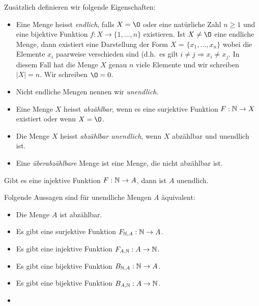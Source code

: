 \begin{definition}{}
    Zusätzlich definieren wir folgende Eigenschaften:
    \begin{itemize}
        \item Eine Menge heisst \emph{endlich}, falls $X = \O$ oder eine natürliche Zahl $n \geq 1$ und eine bijektive Funktion $f : X \rightarrow \{1,\dots,n\}$ existieren.
        Ist $X \neq \O$ eine endliche Menge, dann existiert eine Darstellung der Form $X$ = $\{x_1,\dots,x_n\}$ wobei die Elemente $x_i$ paarweise verschieden sind (d.h.\ es gilt $i \neq j \Rightarrow x_i \neq x_j$.
        In diesem Fall hat die Menge $X$ genau $n$ viele Elemente und wir schreiben $|X| = n$.
        Wir schreiben $\O = 0$.
        \item Nicht endliche Mengen nennen wir \emph{unendlich}.
        \item Eine Menge $X$ heisst \emph{abzählbar}, wenn es eine surjektive Funktion $F: \mathbb{N} \rightarrow X$ existiert oder wenn $X = \O$.
        \item Die Menge $X$ heisst \emph{abzählbar unendlich}, wenn $X$ abzählbar und unendlich ist.
        \item Eine \emph{überabzählbare} Menge ist eine Menge, die nicht abzählbar ist.
    \end{itemize}
\end{definition}

\begin{subbox}{}
    Gibt es eine injektive Funktion $F : \mathbb{N} \rightarrow A$, dann ist $A$ unendlich.
\end{subbox}

\begin{subbox}{}
    Folgende Aussagen sind für unendliche Mengen $A$ äquivalent:
    \begin{multicols}{2}
        \begin{itemize}
            \item Die Menge $A$ ist abzählbar.
            \item Es gibt eine surjektive Funktion $F_{\mathbb{N},A} : \mathbb{N} \rightarrow A$.
            \item Es gibt eine injektive Funktion $F_{A,\mathbb{N}} : A \rightarrow \mathbb{N}$.
            \item Es gibt eine bijektive Funktion $B_{\mathbb{N},A} : \mathbb{N} \rightarrow A$.
            \item Es gibt eine bijektive Funktion $B_{A,\mathbb{N}} : A \rightarrow \mathbb{N}$.
            \item[]
        \end{itemize}
    \end{multicols}
\end{subbox}

